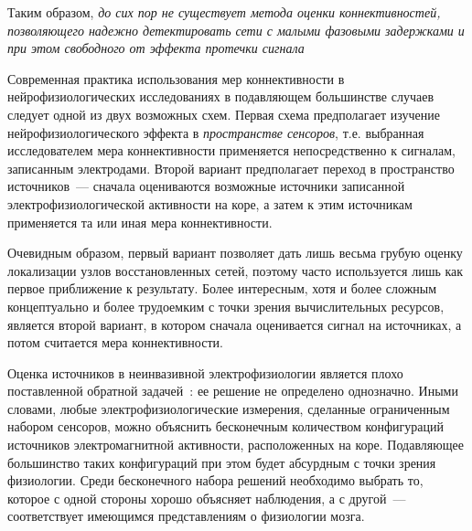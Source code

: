 Таким образом, \emph{до сих пор не существует метода оценки коннективностей,
позволяющего надежно детектировать сети с малыми фазовыми задержками и при этом свободного
от эффекта протечки сигнала}



Современная практика использования мер коннективности в нейрофизиологических
исследованиях в подавляющем большинстве случаев следует одной из двух возможных схем.
Первая схема предполагает изучение нейрофизиологического эффекта  в \emph{пространстве сенсоров},
т.е. выбранная исследователем мера коннективности применяется непосредственно к сигналам,
записанным электродами.
Второй вариант предполагает переход в пространство источников~--- сначала оцениваются
возможные источники записанной электрофизиологической активности на коре, а затем к этим
источникам применяется та или иная  мера коннективности.

Очевидным образом, первый вариант позволяет дать лишь весьма грубую оценку локализации
узлов восстановленных сетей, поэтому часто используется лишь как первое приближение к результату.
Более интересным, хотя и более сложным концептуально и более
трудоемким с точки зрения вычислительных ресурсов, является второй вариант, в котором
сначала оценивается сигнал на источниках, а потом считается мера коннективности.

Оценка источников в неинвазивной электрофизиологии является
плохо поставленной обратной задачей~\cite{Hamalainen1993}:
ее решение не определено однозначно. Иными словами, любые электрофизиологические измерения,
сделанные ограниченным набором сенсоров, можно объяснить бесконечным количеством конфигураций
источников электромагнитной активности, расположенных на коре. Подавляющее большинство таких конфигураций
при этом будет абсурдным с точки зрения физиологии. Среди бесконечного набора
решений необходимо выбрать то, которое с одной стороны хорошо объясняет наблюдения, а с другой~---
соответствует имеющимся представлениям о физиологии мозга.

